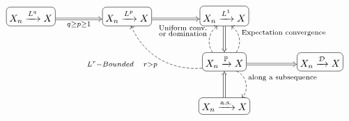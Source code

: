 \[
\begin{tikzcd}[column sep=huge, row sep=large]
|[draw, rounded corners, inner sep=3pt]| {X_n \xrightarrow{L^q} X}
  \arrow[r, "q \ge p \ge 1"', Rightarrow]
&
|[draw, rounded corners, inner sep=3pt]| {X_n \xrightarrow{L^p} X}
  \arrow[r, Rightarrow]
&
|[draw, rounded corners, inner sep=3pt]| {X_n \xrightarrow{L^1} X}
  \arrow[d, Rightarrow]
\\
&&
|[draw, rounded corners, inner sep=3pt]| {X_n \xrightarrow{\PP} X}
  \arrow[r, Rightarrow]
  \arrow[lu, "{L^r-Bounded \quad r>p}", dashed, bend left=35]
  \arrow[u, "{\text{Expectation convergence}}"', dashed, bend right=45]
  \arrow[u, swap, "{\substack{\text{Uniform conv.}\\ \text{or domination}}}"', dashed, bend left=45]
  \arrow[d, "{\text{along a subsequence}}", dashed, bend left=60]
&
|[draw, rounded corners, inner sep=3pt]| {X_n \xrightarrow{\mathcal D} X}
\\
&&
|[draw, rounded corners, inner sep=3pt]| {X_n \xrightarrow{\text{a.s.}} X}
  \arrow[u, Rightarrow]
\end{tikzcd}
\]